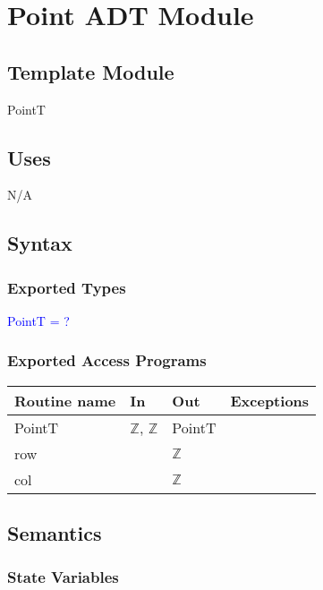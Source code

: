 \documentclass[12pt]{article}
\begin{document}
\newpage

\section* {Point ADT Module}

\subsection*{Template Module}

PointT

\subsection* {Uses}

N/A

\subsection* {Syntax}

\subsubsection* {Exported Types}

\textcolor{blue}{PointT = ?}

\subsubsection* {Exported Access Programs}

\begin{tabular}{| l | l | l | l |}
\hline
\textbf{Routine name} & \textbf{In} & \textbf{Out} & \textbf{Exceptions}\\
\hline
PointT & $\mathbb{Z}$, $\mathbb{Z}$ & PointT & \\
\hline
row & ~ & $\mathbb{Z}$ & ~\\
\hline
col & ~ & $\mathbb{Z}$ & ~\\
\hline
\end{tabular}

\subsection* {Semantics}

\subsubsection* {State Variables}
\end{document}
